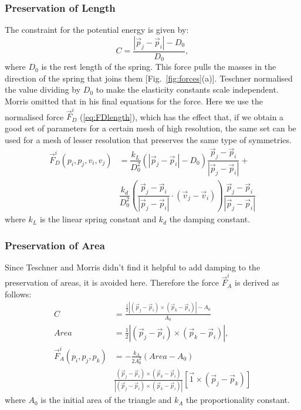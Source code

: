 \documentclass[journal]{IEEEtran}
\newcommand{\eref}[1]{(\ref{#1})}
\newcommand{\fref}[1]{Fig.~\ref{#1}}
\begin{document}
\subsubsection{Preservation of Length}
The constraint for the potential energy is given by:
\begin{equation}
 C = \dfrac{|\vec{p}_j-\vec{p}_i|-D_0}{D_0},
\end{equation}
where $D_0$ is the rest length of the spring.  This force pulls the masses in the direction of the spring that joins them [\fref{fig:forces}(a)].  Teschner normalised the value dividing by $D_0$ to make the elasticity constants scale independent.  Morris \cite{Morris2008} omitted that in his final equations for the force.  Here we use the normalised force $\vec{F}^i_D$ \eref{eq:FDlength}, which has the effect that, if we obtain a good set of parameters for a certain mesh of high resolution, the same set can be used for a mesh of lesser resolution that preserves the same type of symmetries.
\begin{align}
 \vec{F}^i_D(p_i,p_j,v_i,v_j) &= \dfrac{k_L}{D_0^2} \left( |\vec{p}_j-\vec{p}_i|-D_0 \right) \dfrac{\vec{p}_j-\vec{p}_i}{|\vec{p}_j-\vec{p}_i|}  + \nonumber \\
 & \dfrac{k_d}{D_0^2}\left( \dfrac{\vec{p}_j-\vec{p}_i}{|\vec{p}_j-\vec{p}_i|} \cdot (\vec{v}_j-\vec{v}_i) \right) \dfrac{\vec{p}_j-\vec{p}_i}{|\vec{p}_j-\vec{p}_i|} \label{eq:FDlength}
\end{align}
where $k_L$ is the linear spring constant and $k_d$ the damping constant.

\subsubsection{Preservation of Area}
Since Teschner and Morris didn't find it helpful to add damping to the preservation of areas, it is avoided here.  Therefore the force $\vec{F}^i_A$ is derived as follows:
\begin{align}
 C &= \frac{\frac{1}{2}|(\vec{p}_j-\vec{p}_i)\times(\vec{p}_k-\vec{p}_i)|-A_0}{A_0} \\
 Area &= \frac{1}{2}|(\vec{p}_j-\vec{p}_i)\times(\vec{p}_k-\vec{p}_i)|, \\
 \vec{F}^i_A(p_i,p_j,p_k) &= -\frac{k_A}{2A_0^2} \left( Area-A_0 \right) \nonumber \\
 & \frac{(\vec{p}_j-\vec{p}_i)\times(\vec{p}_k-\vec{p}_i)}{|(\vec{p}_j-\vec{p}_i)\times(\vec{p}_k-\vec{p}_i)|} [\vec{1} \times (\vec{p}_j-\vec{p}_k)] \label{eq:area_force}
\end{align}
where $A_0$ is the initial area of the triangle and $k_A$ the proportionality constant.
\end{document}

